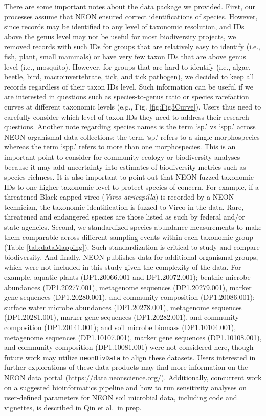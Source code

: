\documentclass[
  12pt,
]{article}
\begin{document}
There are some important notes about the data package we provided. First, our processes assume that NEON ensured correct identifications of species. However, since records may be identified to any level of taxonomic resolution, and IDs above the genus level may not be useful for most biodiversity projects, we removed records with such IDs for groups that are relatively easy to identify (i.e., fish, plant, small mammals) or have very few taxon IDs that are above genus level (i.e., mosquito). However, for groups that are hard to identify (i.e., algae, beetle, bird, macroinvertebrate, tick, and tick pathogen), we decided to keep all records regardless of their taxon IDs level. Such information can be useful if we are interested in questions such as species-to-genus ratio or species rarefaction curves at different taxonomic levels (e.g., Fig. \ref{fig:Fig3Curve}). Users thus need to carefully consider which level of taxon IDs they need to address their research questions. Another note regarding species names is the term `sp.' vs `spp.' across NEON organismal data collections; the term `sp.' refers to a single morphospecies whereas the term `spp.' refers to more than one morphospecies. This is an important point to consider for community ecology or biodiversity analyses because it may add uncertainty into estimates of biodiversity metrics such as species richness. It is also important to point out that NEON fuzzed taxonomic IDs to one higher taxonomic level to protect species of concern. For example, if a threatened Black-capped vireo (\emph{Vireo atricapilla}) is recorded by a NEON technician, the taxonomic identification is fuzzed to Vireo in the data. Rare, threatened and endangered species are those listed as such by federal and/or state agencies. Second, we standardized species abundance measurements to make them comparable across different sampling events within each taxonomic group (Table \ref{tab:dataMapping}). Such standardization is critical to study and compare biodiversity. And finally, NEON publishes data for additional organismal groups, which were not included in this study given the complexity of the data. For example, aquatic plants (DP1.20066.001 and DP1.20072.001); benthic microbe abundances (DP1.20277.001), metagenome sequences (DP1.20279.001), marker gene sequences (DP1.20280.001), and community composition (DP1.20086.001); surface water microbe abundances (DP1.20278.001), metagenome sequences (DP1.20281.001), marker gene sequences (DP1.20282.001), and community composition (DP1.20141.001); and soil microbe biomass (DP1.10104.001), metagenome sequences (DP1.10107.001), marker gene sequences (DP1.10108.001), and community composition (DP1.10081.001) were not considered here, though future work may utilize \texttt{neonDivData} to align these datasets. Users interested in further explorations of these data products may find more information on the NEON data portal (\url{https://data.neonscience.org/}). Additionally, concurrent work on a suggested bioinformatics pipeline and how to run sensitivity analyses on user-defined parameters for NEON soil microbial data, including code and vignettes, is described in Qin et al.~in prep.
\end{document}
